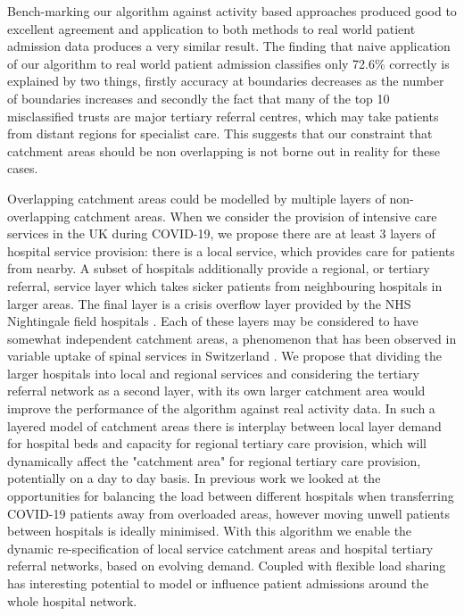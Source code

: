 \documentclass[twocolumn]{bmcart}%
\newcommand{\dataAcc}{72.6\%}
\begin{document}
Bench-marking our algorithm against activity based approaches produced good to excellent agreement and application to 
both methods to real world patient admission data produces a very similar result. The finding that naive application of 
our algorithm to real world patient admission classifies only \dataAcc{} correctly is explained by two things, firstly 
accuracy at boundaries decreases as the number of boundaries increases \cite{arcayaAreaVariationsHealth2012} and 
secondly the fact that many of the top 10 misclassified trusts are major tertiary referral centres, which may take 
patients from distant regions for specialist care. This suggests that our constraint that catchment areas should be non 
overlapping is not borne out in reality for these cases. 

Overlapping catchment areas could be modelled by multiple layers of non-overlapping catchment areas. When we consider 
the provision of intensive care services in the UK during COVID-19, we propose there are at least 3 layers of hospital 
service provision: there is a local service, which provides care for patients from nearby. A subset of hospitals 
additionally provide a regional, or tertiary referral, service layer which takes sicker patients from neighbouring 
hospitals in larger areas. The final layer is a crisis overflow layer provided by the NHS Nightingale field hospitals 
\cite{CoronavirusNightingaleHospital2020}. Each of these layers may be considered to have somewhat independent 
catchment areas, a phenomenon that has been observed in variable uptake of spinal services in Switzerland 
\cite{scheuterUnwarrantedRegionalVariation2018}. We propose that dividing the larger hospitals into local and regional 
services and considering the tertiary referral network as a second layer, with its own larger catchment area would 
improve the performance of the algorithm against real activity data. In such a layered model of catchment areas there is 
interplay between local layer demand for hospital beds and capacity for regional tertiary care provision, which will 
dynamically affect the "catchment area" for regional tertiary care provision, potentially on a day to day basis. In 
previous work we looked at the opportunities for balancing the load between different hospitals 
\cite{lacasaFlexibleMethodOptimising2020} when transferring COVID-19 patients away from overloaded areas, however moving 
unwell patients between hospitals is ideally minimised. With this algorithm we enable the dynamic re-specification of 
local service catchment areas and hospital tertiary referral networks, based on evolving demand. Coupled with flexible 
load sharing has interesting potential to model or influence patient admissions around the whole hospital network.
\end{document}
